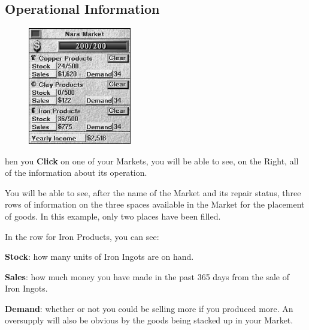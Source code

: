 \subsection{\textsf{Operational Information}}


\begin{figure}
    \vspace{-20pt}
    \begin{center}
        \includegraphics[width=0.4\textwidth]{Imarketinfo} %
    \end{center}
    \vspace{-20pt}
\end{figure}


hen you \textbf{Click} on one of your Markets, you will be able to see, on the Right, all of the information about its operation.


You will be able to see, after the name of the Market and its repair status, three rows of information on the three spaces available in the Market for the placement of goods. In this example, only two places have been filled.

In the row for Iron Products, you can see:


\textbf{Stock}: how many units of Iron Ingots are on hand.

\textbf{Sales}: how much money you have made in the past 365 days from the sale of Iron Ingots.

\textbf{Demand}: whether or not you could be selling more if you produced more. An oversupply will also be obvious by the goods being stacked up in your Market.

